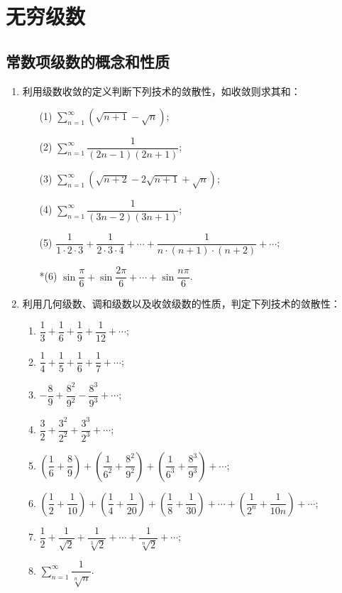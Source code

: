\chapter{无穷级数}\label{cha:6}

\section{常数项级数的概念和性质}

\begin{enumerate}\setlength{\itemsep}{7pt}
    
\item 利用级数收敛的定义判断下列技术的敛散性，如收敛则求其和：  

\begin{enumerate}\setlength{\itemsep}{8pt}
    \item[(1)] $\displaystyle \sum_{n=1}^{\infty}(\sqrt{n+1}-\sqrt{n})$;
    \item[(2)] $\displaystyle \sum_{n=1}^{\infty}\dfrac{1}{(2n-1)(2n+1)}$;
    \item[(3)] $\displaystyle \sum_{n=1}^{\infty}(\sqrt{n+2}-2\sqrt{n+1}+\sqrt{n})$;
    \item[(4)] $\displaystyle \sum_{n=1}^{\infty}\dfrac{1}{(3n-2)(3n+1)}$;
    \item[(5)] $\dfrac{1}{1\cdot2\cdot3}+\dfrac{1}{2\cdot3\cdot4}+\cdots+\dfrac{1}{n\cdot(n+1)\cdot(n+2)}+\cdots$;
    \item[*(6)] $\sin\dfrac{\pi}{6}+\sin\dfrac{2\pi}{6}+\cdots+\sin\dfrac{n\pi}{6}$.
\end{enumerate}  

\item 利用几何级数、调和级数以及收敛级数的性质，判定下列技术的敛散性：
\begin{enumerate}[(1)]\setlength{\itemsep}{10pt}
    \item $\dfrac{1}{3}+\dfrac{1}{6}+\dfrac{1}{9}+\dfrac{1}{12}+\cdots$;
    \item $\dfrac{1}{4}+\dfrac{1}{5}+\dfrac{1}{6}+\dfrac{1}{7}+\cdots$; 
    \item $-\dfrac{8}{9}+\dfrac{8^2}{9^2}-\dfrac{8^3}{9^3}+\cdots$;
    \item $\dfrac{3}{2}+\dfrac{3^2}{2^2}+\dfrac{3^3}{2^3}+\cdots$;
    \item $\left(\dfrac{1}{6}+\dfrac{8}{9}\right)+\left(\dfrac{1}{6^2}+\dfrac{8^2}{9^2}\right)+\left(\dfrac{1}{6^3}+\dfrac{8^3}{9^3}\right)+\cdots$;
    \item $\left(\dfrac{1}{2}+\dfrac{1}{10}\right)+\left(\dfrac{1}{4}+\dfrac{1}{20}\right)+\left(\dfrac{1}{8}+\dfrac{1}{30}\right)+\cdots+\left(\dfrac{1}{2^n}+\dfrac{1}{10n}\right)+\cdots$;
    \item $\dfrac{1}{2}+\dfrac{1}{\sqrt{2}}+\dfrac{1}{\sqrt[3]{2}}+\cdots+\dfrac{1}{\sqrt[n]{2}}+\cdots$;
    \item $\displaystyle\sum_{n=1}^{\infty}\dfrac{1}{\sqrt[n]{n}}$.
\end{enumerate}
\end{enumerate}
    

